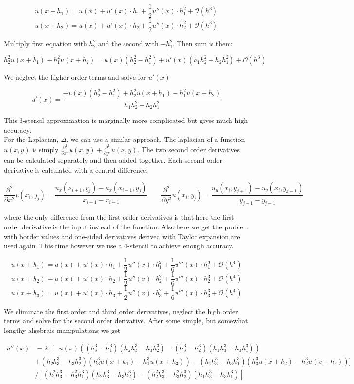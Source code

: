 \documentclass[paper=a4, fontsize=12pt]{article} %
\begin{document}
$$u(x+h_1) = u(x) + u'(x)\cdot h_1 + \frac{1}{2}u''(x)\cdot h_1^2 + \mathcal{O}(h^3)$$
$$u(x+h_2) = u(x) + u'(x)\cdot h_2 + \frac{1}{2}u''(x)\cdot h_2^2 + \mathcal{O}(h^3)$$

Multiply first equation with $h_2^2$ and the second with $-h_1^2$. Then sum is them:

$$ h_2^2 u(x+h_1)  - h_1^2 u(x+h_2)  = u(x) (h_2^2 - h_1^2 ) + u'(x) (h_1 h_2^2 - h_2 h_ 1^2) +  \mathcal{O}(h^3) $$

We neglect the higher order terms and solve for $u'(x)$

$$  u'(x) = \frac{- u(x) (h_2^2 - h_1^2 ) + h_2^2 u(x+h_1)  - h_1^2 u(x+h_2) }{h_1 h_2^2 - h_2 h_ 1^2}  $$

This 3-stencil approximation is marginally more complicated but gives much high accuracy. \\


For the Laplacian, $\Delta$, we can use a similar approach. The laplacian of a function $u(x,y) $ is simply $\frac{\partial^2}{\partial x^2} u(x,y) + \frac{\partial^2}{\partial y^2} u(x,y) $. The two second order derivatives can be calculated separately and then added together. Each second order derivative is calculated with a central difference, 

$$ \frac{\partial^2}{\partial x^2} u(x_i,y_j)  = \frac{u_x(x_{i+1},y_j)-u_x(x_{i-1},y_j)}{x_{i+1} - x_{i-1}} \qquad  \frac{\partial^2}{\partial y^2} u(x_i,y_j)  = \frac{u_y(x_{i},y_{j+1})-u_y(x_{i},y_{j-1})}{y_{j+1} - y_{j-1}}$$ 

where the only difference from the first order derivatives is that here the first order derivative is the input instead of the function. Also here we get the problem with border values and one-sided derivatives derived with Taylor expansion are used again. This time however we use a 4-stencil to achieve enough accuracy.

$$u(x+h_1) = u(x) + u'(x)\cdot h_1 + \frac{1}{2}u''(x)\cdot h_1^2 + \frac{1}{6}u'''(x)\cdot h_1^3 + \mathcal{O}(h^4)$$
$$u(x+h_2) = u(x) + u'(x)\cdot h_2 + \frac{1}{2}u''(x)\cdot h_2^2 + \frac{1}{6}u'''(x)\cdot h_2^3 + \mathcal{O}(h^4)$$
$$u(x+h_3) = u(x) + u'(x)\cdot h_3 + \frac{1}{2}u''(x)\cdot h_3^2 + \frac{1}{6}u'''(x)\cdot h_3^3 + \mathcal{O}(h^4)$$

We eliminate the first order and third order derivatives, neglect the high order terms and solve for the second order derivative. After some simple, but somewhat lengthy algebraic manipulations we get

\begin{align*}
u''(x) &= 2\cdot [ -u(x)((h_3^3 - h_1^3)(h_2h_3^3 - h_3h_2^3)-(h_3^3-h_2^3)(h_1h_3^3-h_3h_1^3))  \\
& + (h_2h_3^3 - h_3h_2^3)(h_3^3u(x+h_1)-h_1^3u(x+h_3))  - (h_1h_3^3 - h_3h_1^3 )(h_3^3 u(x+h_2) -h_2^3 u(x+h_3)) ]\\
&  /  [(h_1^2 h_3^3 - h_3^2 h_1^3 )(h_2 h_3^3 - h_3 h_2^3 )-( h_2^2 h_3^3 - h_3^2 h_2^3 )(h_1 h_3^3 - h_3 h_1^3) ]
\end{align*}
\end{document}
